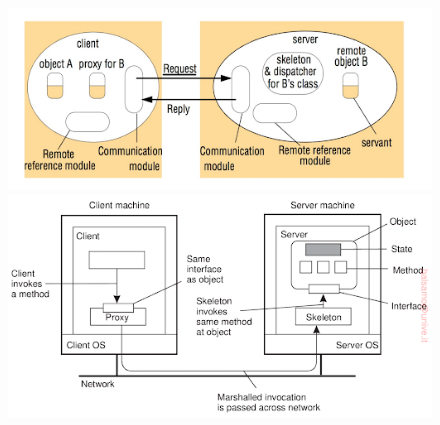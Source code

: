\begin{itemize}
    \begin{figure}[!htb]
       \begin{minipage}{0.48\textwidth}
         \centering
         \includegraphics[width=.99\linewidth]{images/InterprocessCommunication/rmi1.png}
       \end{minipage}\hfill
       \begin{minipage}{0.48\textwidth} 
         \centering
         \includegraphics[width=.99\linewidth]{images/InterprocessCommunication/rmi2.png}
       \end{minipage}
    \end{figure}
        
\end{itemize}

